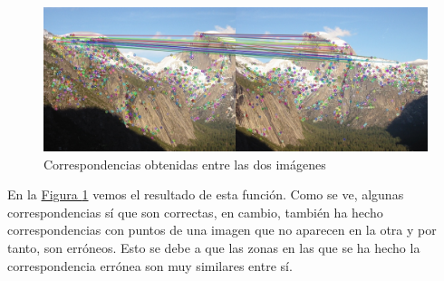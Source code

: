 \documentclass[11pt,a4paper]{article}
\theoremstyle{plain}
\theoremstyle{definition}
\begin{document}
\begin{figure}[!h]
    \centering
    \includegraphics[width=\textwidth]{img12}
    \caption{Correspondencias obtenidas entre las dos imágenes}
    \label{correspondencias}
\end{figure}

En la \hyperref[correspondencias]{Figura \ref*{correspondencias}} vemos el resultado de esta función. Como se ve, algunas correspondencias sí que son correctas, en cambio, también ha hecho correspondencias con puntos de una imagen que no aparecen en la otra y por tanto, son erróneos. Esto se debe a que las zonas en las que se ha hecho la correspondencia errónea son muy similares entre sí.
\end{document}
